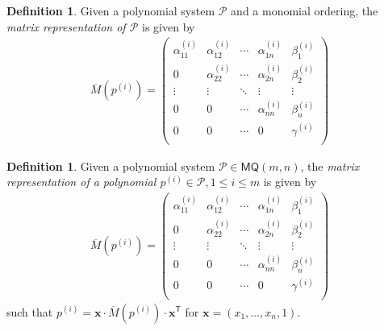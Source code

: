 \documentclass[draft, 12pt, a4paper, oneside]{memoir}
\theoremstyle{definition}
\newtheorem{definition}[theorem]{Definition}
\begin{document}
\begin{definition}
  Given a polynomial system $\mathcal{P}$ and a monomial ordering, the \emph{matrix representation of $\mathcal{P}$} is given by
  \begin{align}
    \overline{M}(p^{(i)}) = 
    \begin{pmatrix}
      \alpha^{(i)}_{11} & \alpha^{(i)}_{12} & \cdots & \alpha^{(i)}_{1n} & \beta^{(i)}_{1}  \\
                      0 & \alpha^{(i)}_{22} & \cdots & \alpha^{(i)}_{2n} & \beta^{(i)}_{2}  \\
                 \vdots &            \vdots & \ddots &            \vdots & \vdots           \\
                      0 &                 0 & \cdots & \alpha^{(i)}_{nn} & \beta^{(i)}_{n}  \\
                      0 &                 0 & \cdots &                 0 & \gamma^{(i)}     \\
    \end{pmatrix}
  \end{align}
\end{definition}

\begin{definition}\label{def:matquad}
  Given a polynomial system $\mathcal{P} \in \textsf{MQ}(m, n)$, the \emph{matrix representation of a polynomial $p^{(i)} \in \mathcal{P}, 1 \leq i \leq m$} is given by
  \begin{align}
    \overline{M}(p^{(i)}) = 
    \begin{pmatrix}
      \alpha^{(i)}_{11} & \alpha^{(i)}_{12} & \cdots & \alpha^{(i)}_{1n} & \beta^{(i)}_{1}  \\
                      0 & \alpha^{(i)}_{22} & \cdots & \alpha^{(i)}_{2n} & \beta^{(i)}_{2}  \\
                 \vdots &            \vdots & \ddots &            \vdots & \vdots           \\
                      0 &                 0 & \cdots & \alpha^{(i)}_{nn} & \beta^{(i)}_{n}  \\
                      0 &                 0 & \cdots &                 0 & \gamma^{(i)}     \\
    \end{pmatrix}
  \end{align}
  such that $p^{(i)} = \mathbf{x} \cdot \overline{M}(p^{(i)}) \cdot \mathbf{x}^{\textsf{T}}$ for $\mathbf{x} = (x_{1}, \dots, x_{n}, 1)$.
\end{definition}
\end{document}
